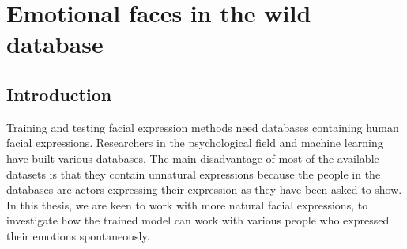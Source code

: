  \chapter{Emotional faces in the wild database}
 \minitoc




%  
 
 
 \section{Introduction}
 \label{sec:ch3_Introduction}
  Training and testing facial expression methods need databases containing human facial expressions. Researchers in the psychological field and machine learning have built various databases. The main disadvantage of most of the available datasets is that they contain unnatural expressions because the people in the databases are actors expressing their expression as they have been asked to show.   
In this thesis, we are keen to work with more natural facial expressions, to investigate how the trained model can work with various people who expressed their emotions spontaneously.

